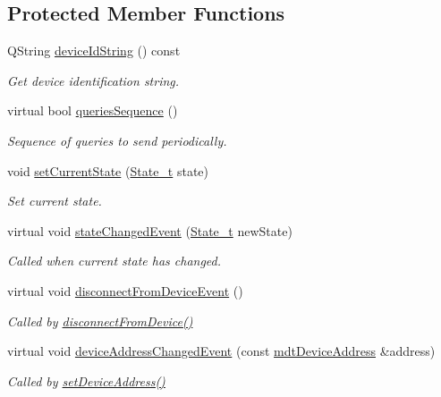\subsection*{Protected Member Functions}
\begin{DoxyCompactItemize}
\item 
Q\-String \hyperlink{classmdt_device_add9f8ec2f944b5c5f92a97424a194177}{device\-Id\-String} () const 
\begin{DoxyCompactList}\small\item\em Get device identification string. \end{DoxyCompactList}\item 
virtual bool \hyperlink{classmdt_device_acba50968d201ad95c4eaa2ab2ed48b4f}{queries\-Sequence} ()
\begin{DoxyCompactList}\small\item\em Sequence of queries to send periodically. \end{DoxyCompactList}\item 
void \hyperlink{classmdt_device_ad2025928441ddca71523ed52a02e89e4}{set\-Current\-State} (\hyperlink{classmdt_device_a8bcf508fbd38a8f0b235e8a9b00319f6}{State\-\_\-t} state)
\begin{DoxyCompactList}\small\item\em Set current state. \end{DoxyCompactList}\item 
virtual void \hyperlink{classmdt_device_ad2646ad2fb99b40c9f303b24a7ee971e}{state\-Changed\-Event} (\hyperlink{classmdt_device_a8bcf508fbd38a8f0b235e8a9b00319f6}{State\-\_\-t} new\-State)
\begin{DoxyCompactList}\small\item\em Called when current state has changed. \end{DoxyCompactList}\item 
virtual void \hyperlink{classmdt_device_afe3dec5b38bb5db7f5f6f250caa5f577}{disconnect\-From\-Device\-Event} ()
\begin{DoxyCompactList}\small\item\em Called by \hyperlink{classmdt_device_a2b694a37d9464d27214bdeceec220998}{disconnect\-From\-Device()} \end{DoxyCompactList}\item 
virtual void \hyperlink{classmdt_device_aeda0ed058f42b7513bb697fe7a1e6ab7}{device\-Address\-Changed\-Event} (const \hyperlink{classmdt_device_address}{mdt\-Device\-Address} \&address)
\begin{DoxyCompactList}\small\item\em Called by \hyperlink{classmdt_device_a3fdad460ae0eac5710b13e400156cb1d}{set\-Device\-Address()} \end{DoxyCompactList}\end{DoxyCompactItemize}
